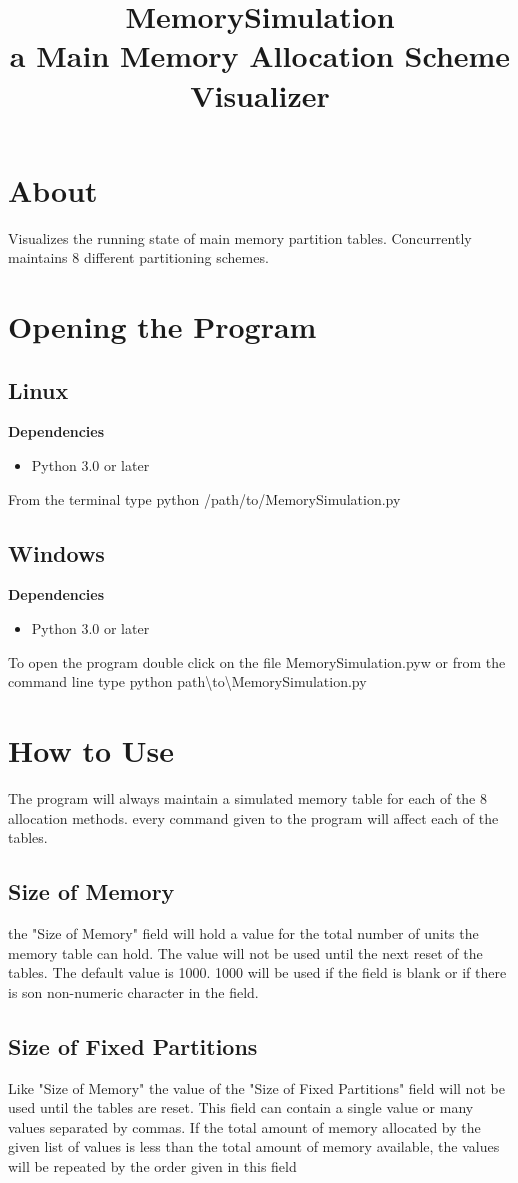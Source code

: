 \documentclass[10pt]{article}
\title{MemorySimulation\\\large{}a Main Memory Allocation Scheme Visualizer}
\date{}
\begin{document}
\maketitle
\section{About}
Visualizes the running state of main memory partition tables. Concurrently maintains 8 different partitioning schemes.
\section{Opening the Program}

\subsection{Linux}
\textbf{Dependencies}
\begin{itemize}
\item Python 3.0 or later
\end{itemize}
From the terminal type python /path/to/MemorySimulation.py
\subsection{Windows}
\textbf{Dependencies}
\begin{itemize}
\item Python 3.0 or later
\end{itemize}
To open the program double click on the file MemorySimulation.pyw or from the command line type python path\textbackslash{}to\textbackslash{}MemorySimulation.py
\section{How to Use}
The program will always maintain a simulated memory table for each of the 8 allocation methods. every command given to the program will affect each of the tables. 
\subsection{Size of Memory}
the "Size of Memory" field will hold a value for the total number of units the memory table can hold. The value will not be used until the next reset of the tables. The default value is 1000. 1000 will be used if the field is blank or if there is son non-numeric character in the field.
\subsection{Size of Fixed Partitions}
Like "Size of Memory" the value of the "Size of Fixed Partitions" field will not be  used until the tables are reset. This field can contain a single value or many values separated by commas. If the total amount of memory allocated by the given list of values is less than the total amount of memory available, the values will be repeated by the order given in this field
\end{document}
